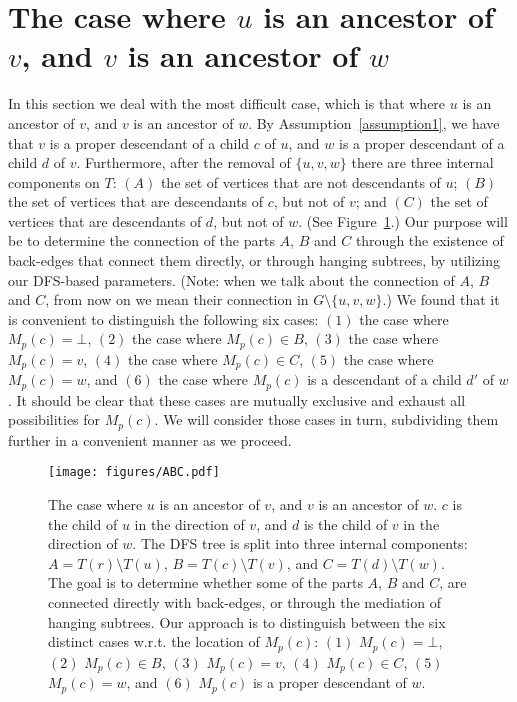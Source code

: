 \documentclass[11pt,a4paper]{article}
\begin{document}
\section{The case where $u$ is an ancestor of $v$, and $v$ is an ancestor of $w$}
\label{section:vwrelated}
In this section we deal with the most difficult case, which is that where $u$ is an ancestor of $v$, and $v$ is an ancestor of $w$. By Assumption~\ref{assumption1}, we have that $v$ is a proper descendant of a child $c$ of $u$, and $w$ is a proper descendant of a child $d$ of $v$. Furthermore, after the removal of $\{u,v,w\}$ there are three internal components on $T$: $(A)$ the set of vertices that are not descendants of $u$; $(B)$ the set of vertices that are descendants of $c$, but not of $v$; and $(C)$ the set of vertices that are descendants of $d$, but not of $w$. (See Figure~\ref{figure:ABC}.) Our purpose will be to determine the connection of the parts $A$, $B$ and $C$ through the existence of back-edges that connect them directly, or through hanging subtrees, by utilizing our DFS-based parameters. (Note: when we talk about the connection of $A$, $B$ and $C$, from now on we mean their connection in $G\setminus\{u,v,w\}$.) We found that it is convenient to distinguish the following six cases: $(1)$ the case where $M_p(c)=\bot$, $(2)$ the case where $M_p(c)\in B$, $(3)$ the case where $M_p(c)=v$, $(4)$ the case where $M_p(c)\in C$, $(5)$ the case where $M_p(c)=w$, and $(6)$ the case where $M_p(c)$ is a descendant of a child $d'$ of $w$. It should be clear that these cases are mutually exclusive and exhaust all possibilities for $M_p(c)$. We will consider those cases in turn, subdividing them further in a convenient manner as we proceed.

\begin{figure}[h!]\centering
\texttt{[image: figures/ABC.pdf]}
\caption{\small{The case where $u$ is an ancestor of $v$, and $v$ is an ancestor of $w$. $c$ is the child of $u$ in the direction of $v$, and $d$ is the child of $v$ in the direction of $w$. The DFS tree is split into three internal components: $A=T(r)\setminus T(u)$, $B=T(c)\setminus T(v)$, and $C=T(d)\setminus T(w)$. The goal is to determine whether some of the parts $A$, $B$ and $C$, are connected directly with back-edges, or through the mediation of hanging subtrees. Our approach is to distinguish between the six distinct cases w.r.t. the location of $M_p(c)$: $(1)$ $M_p(c)=\bot$, $(2)$ $M_p(c)\in B$, $(3)$ $M_p(c)=v$, $(4)$ $M_p(c)\in C$, $(5)$ $M_p(c)=w$, and $(6)$ $M_p(c)$ is a proper descendant of $w$.}}\label{figure:ABC}
\end{figure} 
\end{document}
